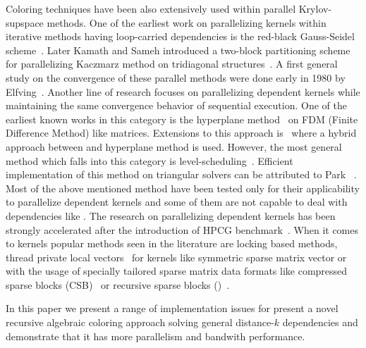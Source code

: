 Coloring techniques have been also extensively used within parallel Krylov-supspace methods. One of the earliest work on parallelizing kernels within iterative methods having loop-carried dependencies is the red-black Gauss-Seidel scheme~\cite{RBGS}. Later Kamath and Sameh introduced a two-block partitioning scheme for parallelizing Kaczmarz method on tridiagonal structures~\cite{Kamath}. A first general study on the convergence of these parallel methods were done early in 1980 by Elfving~\cite{Elfving1980}. Another line of research focuses on parallelizing dependent kernels while maintaining the same convergence behavior of sequential execution. One of the earliest known works in this category is the hyperplane method~\cite{saad} on FDM (Finite Difference Method) like matrices. Extensions to this approach is~\cite{cm-rcm} where a hybrid approach between \MCfull and hyperplane method is used. However, the most general method which falls into this category is level-scheduling~\cite{saad}.  Efficient implementation of this method on triangular solvers can be attributed to Park \etal  ~\cite{park_ls}. Most of the above mentioned method have been tested only for their applicability to parallelize \DONE dependent kernels and some of them are not capable to deal with dependencies like \DTWO. The research on parallelizing \DONE dependent kernels has been strongly accelerated after the introduction of HPCG benchmark~\cite{hpcg}. When it comes to \DTWO kernels popular methods seen in the literature are locking based methods, thread private local vectors~\cite{sparseX,thread_private_symm_spmv} for kernels like symmetric sparse matrix vector or with the usage of specially tailored sparse matrix data formats like compressed sparse blocks (CSB)~\cite{CSB} or recursive sparse blocks (\RSB)~\cite{RSB}.


In this paper we present a range of implementation issues for present a novel recursive algebraic coloring approach solving general distance-$k$ dependencies and demonstrate that it has more parallelism and bandwith performance.

